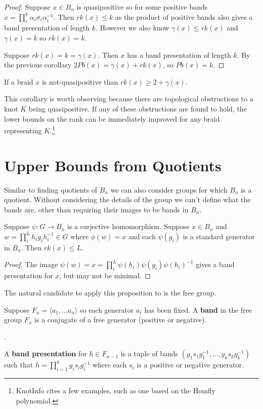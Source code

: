 \documentclass[12pt]{thesis}
\begin{document}
\begin{proof}

    Suppose $x \in B_{n}$ is quasipositive
    so for some positive bands $x = \prod_{i}^{k} \alpha_{i} \sigma_{i} \alpha_{i}^{-1}$.
    Then $rk(x) \leq k$ as the product of positive bands also gives a band presentation of length $k$.
    However we also know $\gamma(x) \leq rk(x)$ and $\gamma(x) = k$ so 
    $rk(x) = k$.

    Suppose $rk(x) = k = \gamma(x)$. Then $x$ has a band presentation of length $k$.
    By the previous corollary $2Pb(x) = \gamma(x) + rk(x)$,
    so $Pb(x) = k$.
\end{proof}

\begin{corollary}
    If a braid $x$ is not-quasipositive than $rk(x) \geq 2 + \gamma(x)$.
\end{corollary}

This corollary is worth observing because there are topological obstructions
to a knot $K$ being quasipositive.
If any of these obstructions are found to hold, the lower bounds
on the rank can be immediately improved for any braid
representing $K$.\footnote{ KnotInfo\cite{knotinfo} cites a few examples,
such as one based on the Homfly polynomial. }

\section{Upper Bounds from Quotients}

Similar to finding quotients of $B_{n}$
we can also consider groups for which $B_{n}$ is a quotient.
Without considering the details of the group
we can't define what the bands are,
other than requiring their images
to be bands in $B_{n}$.

\begin{proposition}
    \label{prop:upper-bounds-from-quotient}
Suppose $\psi \colon G \rightarrow B_{n}$
is a surjective homomorphism.
    Suppose $x \in B_{n}$ and $w = \prod_{i}^{L} h_{i}g_{i}h_{i}^{-1} \in G$
    where $\phi(w) = x$
    and each $\psi(g_{i})$ is a standard
    generator in $B_{n}$. 
    Then $rk(x) \leq L$.
\end{proposition}
\begin{proof}
    The image $\psi(w) = x = \prod_{i}^{L} \psi(h_{i}) \psi(g_{i}) \psi(h_{i})^{-1}$
    gives a band presentation for $x$, but may not be minimal.
\end{proof}

The natural candidate to apply this proposition to is the free group.
\begin{definition}
    Suppose $F_{n} = \langle a_{1}, \ldots a_{n} \rangle$
    so each generator $a_{i}$ has been fixed.
    A \textbf{band} in the free group $F_{n}$ is a conjugate
    of a free generator (positive or negative).
\end{definition}.
\begin{definition}
    A \textbf{band presentation} for $h \in F_{n-1}$ is a 
    tuple of bands $(g_{1}s_{1}g_{1}^{-1}, \ldots, g_{k}s_{k}g_{k}^{-1})$
    such that $h = \prod_{i=1}^{k} g_{i}s_{i}g_{i}^{-1}$
    where each $s_{i}$ is a positive or negative generator.
\end{definition}
\end{document}
